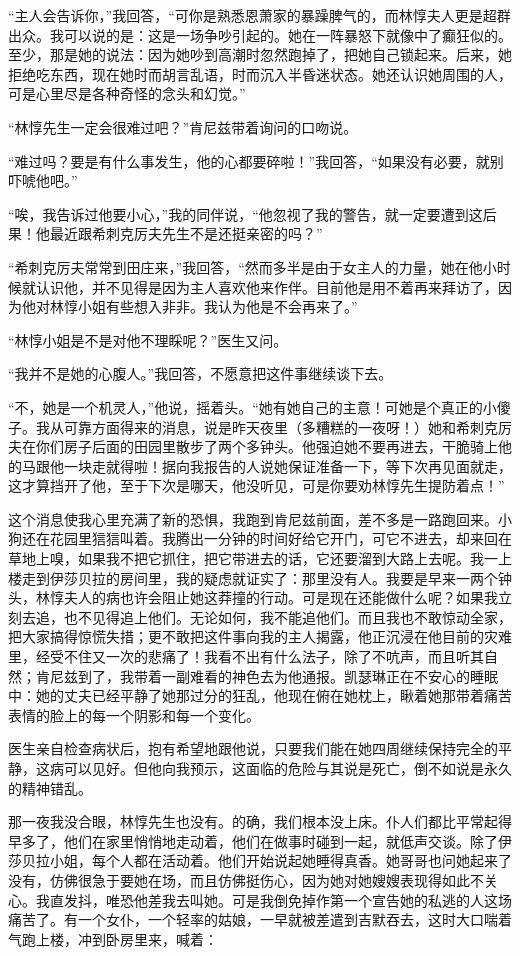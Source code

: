 \par “主人会告诉你，”我回答，“可你是熟悉恩萧家的暴躁脾气的，而林惇夫人更是超群出众。我可以说的是：这是一场争吵引起的。她在一阵暴怒下就像中了癫狂似的。至少，那是她的说法：因为她吵到高潮时忽然跑掉了，把她自己锁起来。后来，她拒绝吃东西，现在她时而胡言乱语，时而沉入半昏迷状态。她还认识她周围的人，可是心里尽是各种奇怪的念头和幻觉。”
\par “林惇先生一定会很难过吧？”肯尼兹带着询问的口吻说。
\par “难过吗？要是有什么事发生，他的心都要碎啦！”我回答，“如果没有必要，就别吓唬他吧。”
\par “唉，我告诉过他要小心，”我的同伴说，“他忽视了我的警告，就一定要遭到这后果！他最近跟希刺克厉夫先生不是还挺亲密的吗？”
\par “希刺克厉夫常常到田庄来，”我回答，“然而多半是由于女主人的力量，她在他小时候就认识他，并不见得是因为主人喜欢他来作伴。目前他是用不着再来拜访了，因为他对林惇小姐有些想入非非。我认为他是不会再来了。”
\par “林惇小姐是不是对他不理睬呢？”医生又问。
\par “我并不是她的心腹人。”我回答，不愿意把这件事继续谈下去。
\par “不，她是一个机灵人，”他说，摇着头。“她有她自己的主意！可她是个真正的小傻子。我从可靠方面得来的消息，说是昨天夜里（多糟糕的一夜呀！）她和希刺克厉夫在你们房子后面的田园里散步了两个多钟头。他强迫她不要再进去，干脆骑上他的马跟他一块走就得啦！据向我报告的人说她保证准备一下，等下次再见面就走，这才算挡开了他，至于下次是哪天，他没听见，可是你要劝林惇先生提防着点！”
\par 这个消息使我心里充满了新的恐惧，我跑到肯尼兹前面，差不多是一路跑回来。小狗还在花园里狺狺叫着。我腾出一分钟的时间好给它开门，可它不进去，却来回在草地上嗅，如果我不把它抓住，把它带进去的话，它还要溜到大路上去呢。我一上楼走到伊莎贝拉的房间里，我的疑虑就证实了：那里没有人。我要是早来一两个钟头，林惇夫人的病也许会阻止她这莽撞的行动。可是现在还能做什么呢？如果我立刻去追，也不见得追上他们。无论如何，我不能追他们。而且我也不敢惊动全家，把大家搞得惊慌失措；更不敢把这件事向我的主人揭露，他正沉浸在他目前的灾难里，经受不住又一次的悲痛了！我看不出有什么法子，除了不吭声，而且听其自然；肯尼兹到了，我带着一副难看的神色去为他通报。凯瑟琳正在不安心的睡眠中：她的丈夫已经平静了她那过分的狂乱，他现在俯在她枕上，瞅着她那带着痛苦表情的脸上的每一个阴影和每一个变化。
\par 医生亲自检查病状后，抱有希望地跟他说，只要我们能在她四周继续保持完全的平静，这病可以见好。但他向我预示，这面临的危险与其说是死亡，倒不如说是永久的精神错乱。
\par 那一夜我没合眼，林惇先生也没有。的确，我们根本没上床。仆人们都比平常起得早多了，他们在家里悄悄地走动着，他们在做事时碰到一起，就低声交谈。除了伊莎贝拉小姐，每个人都在活动着。他们开始说起她睡得真香。她哥哥也问她起来了没有，仿佛很急于要她在场，而且仿佛挺伤心，因为她对她嫂嫂表现得如此不关心。我直发抖，唯恐他差我去叫她。可是我倒免掉作第一个宣告她的私逃的人这场痛苦了。有一个女仆，一个轻率的姑娘，一早就被差遣到吉默吞去，这时大口喘着气跑上楼，冲到卧房里来，喊着：
